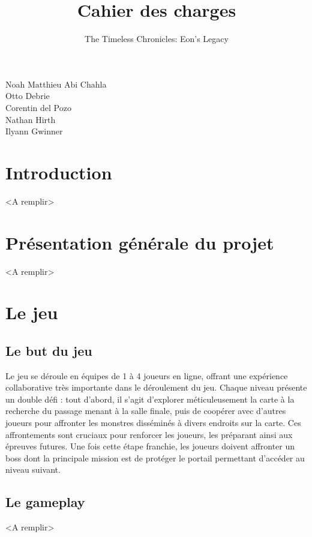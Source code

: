 \documentclass{article}
\title{Cahier des charges}
\author{The Timeless Chronicles: Eon's Legacy}
\date{}
\begin{document}
\maketitle
\begin{center}
    Noah Matthieu Abi Chahla\\
    Otto Debrie\\
    Corentin del Pozo\\
    Nathan Hirth\\
    Ilyann Gwinner\\
\end{center}
\pagebreak
\tableofcontents
\pagebreak

\section{Introduction}
<A remplir>
\section{Présentation générale du projet}
<A remplir>
\section{Le jeu}
\subsection{Le but du jeu}
Le jeu se déroule en équipes de 1 à 4 joueurs en ligne, offrant une expérience collaborative très importante dans le déroulement du jeu. Chaque niveau présente un double défi : tout d'abord, il s'agit d'explorer méticuleusement la carte à la recherche du passage menant à la salle finale, puis de coopérer avec d'autres joueurs pour affronter les monstres disséminés à divers endroits sur la carte. Ces affrontements sont cruciaux pour renforcer les joueurs, les préparant ainsi aux épreuves futures. Une fois cette étape franchie, les joueurs doivent affronter un boss dont la principale mission est de protéger le portail permettant d'accéder au niveau suivant.
\subsection{Le gameplay}
<A remplir>
\end{document}
